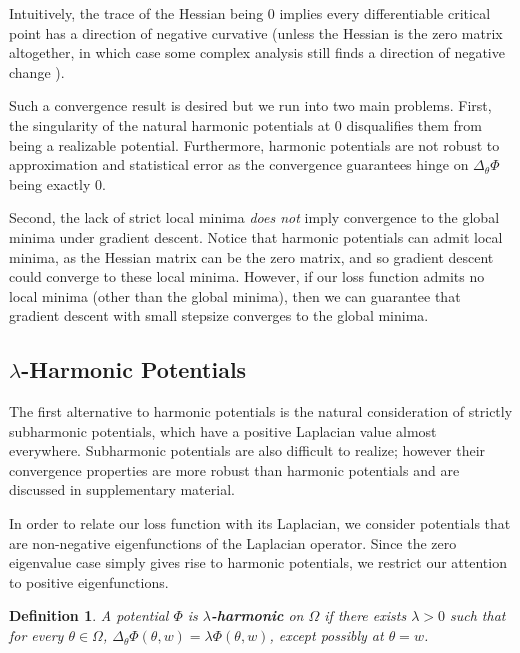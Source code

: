 \documentclass{article}
\newtheorem{definition}[theorem]{Definition}
\begin{document}
Intuitively, the trace of the Hessian being 0 implies every
differentiable critical point has a direction of negative curvative
(unless the Hessian is the zero matrix altogether, in which case some
complex analysis still finds a direction of negative change
\cite{arnold1985mathematical}). 

Such a convergence result is desired but we run into two main problems. First, the singularity of the natural harmonic potentials at $0$ disqualifies them from being a realizable potential. Furthermore, harmonic potentials are not robust to approximation and statistical error as the convergence guarantees hinge on $\Delta_\theta\Phi$ being exactly 0. 

Second, the lack of strict local minima {\it does not} imply
convergence to the global minima under gradient descent. Notice that
harmonic potentials can admit local minima, as the Hessian matrix can
be the zero matrix, and so gradient descent could converge to these
local minima. However, if our loss function admits no local minima
(other than the global minima), then we can guarantee that gradient
descent with small stepsize converges to the global minima.

\subsection{$\lambda$-Harmonic Potentials}

The first alternative to harmonic potentials is the natural
consideration of strictly subharmonic potentials, which have a
positive Laplacian value almost everywhere. Subharmonic potentials are
also difficult to realize; however their convergence properties are
more robust than harmonic potentials and are discussed in supplementary material. 

%
In order to relate our loss function with its Laplacian, we consider potentials that are non-negative eigenfunctions of the Laplacian operator. Since the zero eigenvalue case simply gives rise to harmonic potentials, we restrict our attention to positive eigenfunctions.
%
\begin{definition}
A potential $\Phi$ is {\bf$\lambda$-harmonic} on $\Omega$ if there exists $\lambda > 0$ such that for every $\theta \in \Omega$, $\Delta_\theta \Phi(\theta, w) = \lambda \Phi(\theta,w) $, except possibly at $\theta = w$.
\end{definition}
\end{document}
